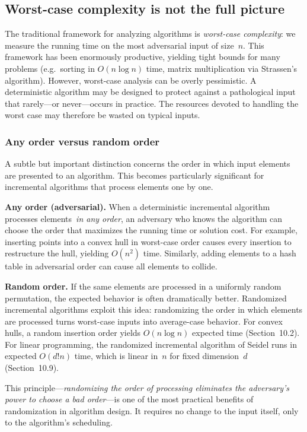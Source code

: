 \documentclass[twoside,12pt]{book}
\theoremstyle{plain}
\theoremstyle{definition}
\theoremstyle{remark}
\begin{document}
\subsection{Worst-case complexity is not the full picture}

The traditional framework for analyzing algorithms is \emph{worst-case
complexity}: we measure the running time on the most adversarial input of
size~$n$. This framework has been enormously productive, yielding tight
bounds for many problems (e.g.\ sorting in $O(n \log n)$ time, matrix
multiplication via Strassen's algorithm). However, worst-case analysis can
be overly pessimistic. A deterministic algorithm may be designed to protect
against a pathological input that rarely---or never---occurs in practice.
The resources devoted to handling the worst case may therefore be wasted on
typical inputs.

\subsubsection{Any order versus random order}

A subtle but important distinction concerns the order in which input
elements are presented to an algorithm. This becomes particularly
significant for incremental algorithms that process elements one by one.

\textbf{Any order (adversarial).} When a deterministic incremental algorithm
processes elements~\emph{in any order}, an adversary who knows the algorithm
can choose the order that maximizes the running time or solution cost. For
example, inserting points into a convex hull in worst-case order causes
every insertion to restructure the hull, yielding $O(n^2)$ time. Similarly,
adding elements to a hash table in adversarial order can cause all elements
to collide.

\textbf{Random order.} If the same elements are processed in a uniformly
random permutation, the expected behavior is often dramatically better.
Randomized incremental algorithms exploit this idea: randomizing the order
in which elements are processed turns worst-case inputs into average-case
behavior. For convex hulls, a random insertion order yields $O(n \log n)$
expected time (Section~10.2). For linear programming, the randomized
incremental algorithm of Seidel runs in expected $O(d! n)$ time, which is
linear in~$n$ for fixed dimension~$d$ (Section~10.9).

This principle---\emph{randomizing the order of processing eliminates the
adversary's power to choose a bad order}---is one of the most practical
benefits of randomization in algorithm design. It requires no change to the
input itself, only to the algorithm's scheduling.
\end{document}
